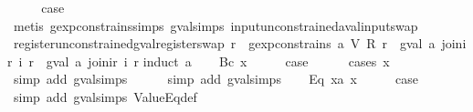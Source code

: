 \begin{isabellebody}
\ \ \isamarkupfalse%
\ \isamarkupfalse%
\ {\isacharquery}case\isanewline
\ \ \ \ \isamarkupfalse%
\ {\isacharparenleft}metis\ gexp{\isacharunderscore}constrains{\isachardot}simps{\isacharparenleft}{}{\isacharparenright}\ gval{\isachardot}simps{\isacharparenleft}{}{\isacharparenright}\ input{\isacharunderscore}unconstrained{\isacharunderscore}aval{\isacharunderscore}input{\isacharunderscore}swap{\isacharparenright}\isanewline
{}\isamarkupfalse%
%
\endisatagproof
{\isafoldproof}%
%
\isadelimproof
\isanewline
%
\endisadelimproof
\isanewline
{}\isamarkupfalse%
\ register{\isacharunderscore}unconstrained{\isacharunderscore}gval{\isacharunderscore}register{\isacharunderscore}swap{\isacharcolon}\ {\isachardoublequoteopen}{\isasymforall}r{\isachardot}\ {\isasymnot}\ gexp{\isacharunderscore}constrains\ a\ {\isacharparenleft}V\ {\isacharparenleft}R\ r{\isacharparenright}{\isacharparenright}\ {\isasymLongrightarrow}\ {\isacharparenleft}gval\ a\ {\isacharparenleft}join{\isacharunderscore}ir\ i\ r{\isacharparenright}\ {\isacharequal}\ gval\ a\ {\isacharparenleft}join{\isacharunderscore}ir\ i\ r{\isacharprime}{\isacharparenright}{\isacharparenright}{\isachardoublequoteclose}\isanewline
%
\isadelimproof
%
\endisadelimproof
%
\isatagproof
{}\isamarkupfalse%
{\isacharparenleft}induct\ a{\isacharparenright}\isanewline
\ \ \isamarkupfalse%
\ {\isacharparenleft}Bc\ x{\isacharparenright}\isanewline
\ \ \isamarkupfalse%
\ \isamarkupfalse%
\ {\isacharquery}case\isanewline
\ \ \ \ \isamarkupfalse%
\ {\isacharparenleft}cases\ x{\isacharparenright}\isanewline
\ \ \ \ \ \isamarkupfalse%
\ {\isacharparenleft}simp\ add{\isacharcolon}\ gval{\isachardot}simps{\isacharparenleft}{}{\isacharparenright}{\isacharparenright}\isanewline
\ \ \ \ \isamarkupfalse%
\ {\isacharparenleft}simp\ add{\isacharcolon}\ gval{\isachardot}simps{\isacharparenleft}{}{\isacharparenright}{\isacharparenright}\isanewline
{}\isamarkupfalse%
\isanewline
\ \ \isamarkupfalse%
\ {\isacharparenleft}Eq\ x{}a\ x{}{\isacharparenright}\isanewline
\ \ \isamarkupfalse%
\ \isamarkupfalse%
\ {\isacharquery}case\isanewline
\ \ \ \ \isamarkupfalse%
\ {\isacharparenleft}simp\ add{\isacharcolon}\ gval{\isachardot}simps\ ValueEq{\isacharunderscore}def{\isacharparenright}\isanewline
\ \ \ \ \isamarkupfalse%

\end{isabellebody}
